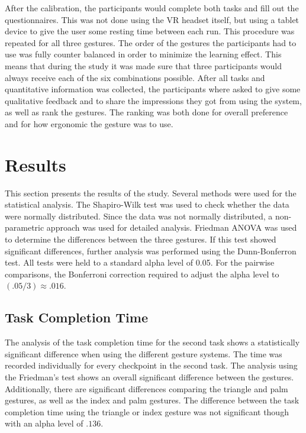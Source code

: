 After the calibration, the participants would complete both tasks and fill out the questionnaires. This was not done using the VR headset itself, but using a tablet device to give the user some resting time between each run. This procedure was repeated for all three gestures. 
The order of the gestures the participants had to use was fully counter balanced in order to minimize the learning effect. This means that during the study it was made sure that three participants would always receive each of the six combinations possible. 
After all tasks and quantitative information was collected, the participants where asked to give some qualitative feedback and to share the impressions they got from using the system, as well as rank the gestures. The ranking was both done for overall preference and for how ergonomic the gesture was to use.   


\section{Results}
This section presents the results of the study. Several methods were used for the statistical analysis. The Shapiro-Wilk test was used to check whether the data were normally distributed. Since the data was not normally distributed, a non-parametric approach was used for detailed analysis. Friedman ANOVA was used to determine the differences between the three gestures. If this test showed significant differences, further analysis was performed using the Dunn-Bonferron test. All tests were held to a standard alpha level of 0.05. For the
pairwise comparisons, the Bonferroni correction required to adjust the alpha level to $(.05/3) \approx .016$.

\subsection{Task Completion Time}
The analysis of the task completion time for the second task shows a statistically significant difference when using the different gesture systems. The time was recorded individually for every checkpoint in the second task. The analysis using the Friedman’s test shows an overall significant difference between the gestures. Additionally, there are significant differences comparing the triangle and palm gestures, as well as the index and palm gestures. The difference between the task completion time using the triangle or index gesture was not significant though with an alpha level of $.136$.

